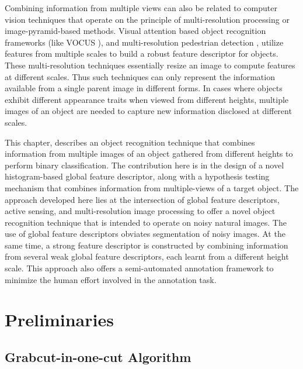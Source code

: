 Combining information from multiple views can also be related to computer vision techniques that operate on the principle of multi-resolution processing or image-pyramid-based methods. Visual attention based object recognition frameworks (like VOCUS \cite{frintrop}), and multi-resolution pedestrian detection \cite{park}, utilize features from multiple scales to build a robust feature descriptor for objects. These multi-resolution techniques essentially resize an image to compute features at different scales. Thus such techniques can only represent the information available from a single parent image in different forms. In cases where objects exhibit different appearance traits when viewed from different heights, multiple images of an object are needed to capture new information disclosed at different scales.

This chapter, describes an object recognition technique that combines information from multiple images of an object gathered from different heights to perform binary classification. The contribution here is in the design of a novel histogram-based global feature descriptor, along with a hypothesis testing mechanism that combines information from multiple-views of a target object. The approach developed here lies at the intersection of global feature descriptors, active sensing, and multi-resolution image processing to offer a novel object recognition technique that is intended to operate on noisy natural images. The use of global feature descriptors obviates segmentation of noisy images. At the same time, a strong feature descriptor is constructed by combining information from several weak global feature descriptors, each learnt from a different height scale. This approach also offers a semi-automated annotation framework to minimize the human effort involved in the annotation task.

\section{Preliminaries}

\subsection{Grabcut-in-one-cut Algorithm}
\label{sec:onecut}

